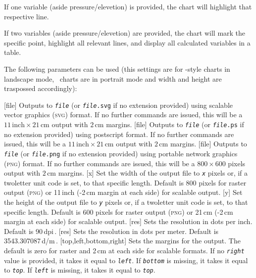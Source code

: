 \documentclass[letterpaper]{article}
\begin{document}
If one variable (aside pressure/elevetion) is provided, the chart will
highlight that respective line.

If two variables (aside pressure/elevetion) are provided, the chart will
mark the specific point, highlight all relevant lines,
and display all calculated variables in a table.

The following parameters can be used (this settings are for
\ashrae-style charts in landscape mode, \mollier\ charts are in portrait
mode and width and height are traspossed accordingly):

\begin{clioptions}
[file] Outputs to \texttt{\textit{file}} (or
  \texttt{\textit{file}.svg} if no extension provided) using scalable
  vector graphics (\textsc{svg}) format.
  If no further commands are issued, this will be a
  $11\,\textrm{inch}\times21\,\textrm{cm}$ output with $2\,\textrm{cm}$
  margins.
[file] Outputs to \texttt{\textit{file}} (or
  \texttt{\textit{file}.ps} if no extension provided) using postscript
  format.
  If no further commands are issued, this will be a
  $11\,\textrm{inch}\times21\,\textrm{cm}$ output with $2\,\textrm{cm}$
  margins.
[file] Outputs to \texttt{\textit{file}} (or
  \texttt{\textit{file}.png} if no extension provided) using portable
  network graphics (\textsc{png}) format.
  If no further commands are issued, this will be a
  $800\times600$ pixels output with $2\,\textrm{cm}$
  margins.
[x] Set the width of the output file to
  \texttt{\textit{x}} pixels or, if a twoletter unit code is set, to
  that specific length. Default is 800 pixels for raster output
  (\textsc{png}) or 11\,inch (-2\,cm margin at each side) for scalable
  output.
[y] Set the height of the output file to
  \texttt{\textit{y}} pixels or, if a twoletter unit code is set, to
  that specific length. Default is 600 pixels for raster output
  (\textsc{png}) or 21\,cm (-2\,cm margin at each side) for scalable
  output.
[res] Sets the resolution in dots per inch.
  Default is 90\,dpi\,.
[res] Sets the resolution in dots per meter.
  Default is 3543.307087\,d/m\,.
[top,left,bottom,right] Sets the margins for the
  output. The default is zero for raster and 2\,cm at each side for
  scalable formats.
  If no \texttt{\textit{right}} value is provided, it takes it equal to
  \texttt{\textit{left}}. If \texttt{\textit{bottom}} is missing, it
  takes it equal to \texttt{\textit{top}}. If \texttt{\textit{left}}
  is missing, it takes it equal to \texttt{\textit{top}}.
  

\end{clioptions}
\end{document}
